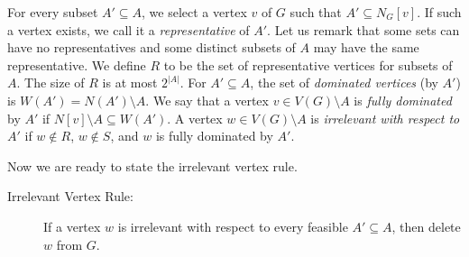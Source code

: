 \documentclass[11pt]{article}
\begin{document}
For every subset $A' \subseteq A$, we select a vertex $v$ of $G$ such that $A'\subseteq N_G[v]$. If such a vertex exists,  we call it a \emph{representative} of $A'$. 
Let us remark that some sets can have no representatives and some distinct subsets of $A$ may have the same representative. 
We define $R$ to be the set of representative vertices for subsets of $A$. The size of $R$ is at most $2^{|A|}$. For $A' \subseteq A$,  the set of {\em dominated vertices} (by $A'$) is $W(A')= N(A') \setminus A$. We say that a  vertex $v \in V(G) \setminus A$ is {\em fully dominated} by $A'$ if $N[v] \setminus A \subseteq W(A')$. A vertex $w \in V(G) \setminus A$ is {\em irrelevant with respect to $A'$} if $w \notin R$, $w \notin S$,  and $w$ is fully dominated by $A'$. 

Now we are ready to state the irrelevant vertex rule. 
\begin{description}
\item[Irrelevant Vertex Rule:] If a vertex $w$ is irrelevant with respect to every feasible $A' \subseteq A$, then delete $w$ from $G$. 
\end{description}
\end{document}
